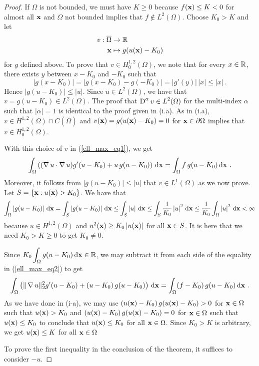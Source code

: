 \begin{proof}
If $\Omega$ is not bounded, we must have $K\geq 0$ because
$f(\mathbf{x}) \leq K<0$ for almost all $\mathbf{x}$ and
$\Omega$ not bounded implies that $\displaystyle f \not\in L^2(\Omega)$.
Choose $K_0 > K$ and let
\begin{align*}
v: \overline{\Omega} & \rightarrow \mathbb{R} \\
\mathbf{x} &\mapsto g(u(\mathbf{x})-K_0)
\end{align*}
for $g$ defined above.  To prove that $\displaystyle v\in H^{1,2}_0(\Omega)$, we
note that for every $x \in \mathbb{R}$, there exists $y$ between $x-K_0$ and
$-K_0$ such that
\[
\left|g(x-K_0)\right| = \left|g(x-K_0) - g(-K_0)\right| =
|g'(y)|\,|x| \leq |x| \ .
\]
Hence $|g(u-K_0)| \leq |u|$.  Since $\displaystyle u \in L^2(\Omega)$,
we have that $\displaystyle v = g(u-K_0) \in L^2(\Omega)$.  The proof that
$\displaystyle \operatorname{D}^\alpha v \in L^2(\Omega)$ for the multi-index
$\alpha$ such that $|\alpha|=1$ is identical to the proof given in (i.a).
As in (i.a), $\displaystyle v\in H^{1,2}(\Omega) \cap C(\overline{\Omega})$ and
$v(\mathbf{x}) = g(u(\mathbf{x})-K_0) = 0$ for $\mathbf{x}\in \partial \Omega$
implies that $\displaystyle v\in H^{1,2}_0(\Omega)$.

With this choice of $v$ in (\ref{ell_max_eq1}), we get
\begin{equation} \label{ell_max_eq2}
\int_\Omega \left( (\operatorname{\nabla} u \cdot \operatorname{\nabla} u ) g'(u-K_0) 
+ u \, g(u-K_0) \right) \,\mathrm{d}{\mathbf{x}} = \int_\Omega f\,g(u-K_0)
\,\mathrm{d}{\mathbf{x}} \ .
\end{equation}
Moreover, it follows from $|g(u-K_0)| \leq |u|$ that
$v \in L^1(\Omega)$ as we now prove.  Let
$\displaystyle S = \left\{ \mathbf{x} : u(\mathbf{x}) > K_0 \right\}$.  We
have that
\[
\int_\Omega \left|g(u-K_0)\right| \,\mathrm{d}{\mathbf{x}}
= \int_S \left|g(u-K_0)\right| \,\mathrm{d}{\mathbf{x}}
\leq \int_S \left|u\right| \,\mathrm{d}{\mathbf{x}}
\leq \int_S \frac{1}{K_0} \left|u\right|^2 \,\mathrm{d}{\mathbf{x}}
\leq \frac{1}{K_0} \int_\Omega \left|u\right|^2 \,\mathrm{d}{\mathbf{x}} < \infty
\]
because $u \in H^{1,2}(\Omega)$ and
$u^2(\mathbf{x})\geq K_0 \left|u(\mathbf{x})\right|$ for all $\mathbf{x} \in S$.
It is here that we need $K_0>K\geq 0$ to get $K_0 \neq 0$.

Since $\displaystyle K_0 \int_\Omega g(u-K_0) \,\mathrm{d}{\mathbf{x}} \in \mathbb{R}$, we may
subtract it from each side of the equality in (\ref{ell_max_eq2}) to get
\[
\int_\Omega \left( \|\operatorname{\nabla} u\|_2^2 g'(u-K_0) 
+ (u-K_0) \, g(u-K_0) \right) \,\mathrm{d}{\mathbf{x}} = \int_\Omega (f-K_0)\,g(u-K_0)
\,\mathrm{d}{\mathbf{x}} \ .
\]
As we have done in (i-a), we may use
$(u(\mathbf{x})-K_0) \, g(u(\mathbf{x})-K_0) > 0$ for
$\mathbf{x} \in \Omega$ such that $u(\mathbf{x})>K_0$ and
$(u(\mathbf{x})-K_0) \, g(u(\mathbf{x})-K_0) = 0$ for
$\mathbf{x} \in \Omega$ such that $u(\mathbf{x})\leq K_0$ to conclude that
$u(\mathbf{x}) \leq K_0$ for all $\mathbf{x}\in \Omega$.  Since $K_0>K$ is
arbitrary, we get $u(\mathbf{x}) \leq K$ for all $\mathbf{x}\in \Omega$

 To prove the first inequality in the conclusion of the
theorem, it suffices to consider $-u$.
\end{proof}

